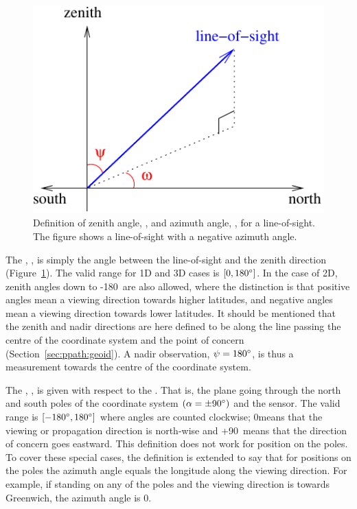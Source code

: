 \begin{figure}
 \begin{center}
  \begin{minipage}[c]{0.6\textwidth}
   \includegraphics*[width=0.99\hsize]{za_and_aa_angles}
  \end{minipage}%
  \begin{minipage}[c]{0.4\textwidth}
   \caption{Definition of zenith angle, \ZntAng, and azimuth angle, 
       \AzmAng, for a line-of-sight. The figure shows a line-of-sight
       with a negative azimuth angle.}
   \label{fig:fm_defs:los}
  \end{minipage}
 \end{center}
\end{figure}           
 
The , \ZntAng, is simply the angle between the
line-of-sight and the zenith direction (Figure~\ref{fig:fm_defs:los}).
The valid range for 1D and 3D cases is $[0,180^\circ]$. In the case
of 2D, zenith angles down to -180\degree\ are also allowed, where the
distinction is that positive angles mean a viewing direction towards
higher latitudes, and negative angles mean a viewing direction towards
lower latitudes. It should be mentioned that the zenith and nadir
directions are here defined to be along the line passing the centre of
the coordinate system and the point of concern
(Section~\ref{sec:ppath:geoid}). A nadir observation,
$\psi=180^\circ$, is thus a measurement towards the centre of the
coordinate system.

The , \AzmAng, is given with respect to the
.  That is, the plane going through the
north and south poles of the coordinate system $(\alpha=\pm90^\circ)$
and the sensor. The valid range is $[-180^\circ,180^\circ]$ where
angles are counted clockwise; 0\degree means that the viewing or
propagation direction is north-wise and +90\degree\ means that the
direction of concern goes eastward. This definition does not work for
position on the poles. To cover these special cases, the definition is
extended to say that for positions on the poles the azimuth angle
equals the longitude along the viewing direction. For example, if
standing on any of the poles and the viewing direction is towards
Greenwich, the azimuth angle is 0\degree.

